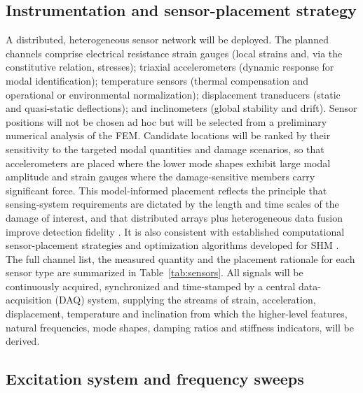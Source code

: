 \subsection{Instrumentation and sensor-placement strategy}\label{subsec:instrumentation}

A distributed, heterogeneous sensor network will be deployed. The planned channels comprise electrical resistance strain gauges (local strains and, via the constitutive relation, stresses); triaxial accelerometers (dynamic response for modal identification); temperature sensors (thermal compensation and operational or environmental normalization); displacement transducers (static and quasi-static deflections); and inclinometers (global stability and drift). Sensor positions will not be chosen ad hoc but will be selected from a preliminary numerical analysis of the FEM. Candidate locations will be ranked by their sensitivity to the targeted modal quantities and damage scenarios, so that accelerometers are placed where the lower mode shapes exhibit large modal amplitude and strain gauges where the damage-sensitive members carry significant force. This model-informed placement reflects the principle that sensing-system requirements are dictated by the length and time scales of the damage of interest, and that distributed arrays plus heterogeneous data fusion improve detection fidelity \citep{farrar2013shm}. It is also consistent with established computational sensor-placement strategies and optimization algorithms developed for SHM \citep{tan2020sensorplacement,hassani2023sensorplacement}. The full channel list, the measured quantity and the placement rationale for each sensor type are summarized in Table~\ref{tab:sensors}. All signals will be continuously acquired, synchronized and time-stamped by a central data-acquisition (DAQ) system, supplying the streams of strain, acceleration, displacement, temperature and inclination from which the higher-level features, natural frequencies, mode shapes, damping ratios and stiffness indicators, will be derived.

\subsection{Excitation system and frequency sweeps}\label{subsec:excitation}

